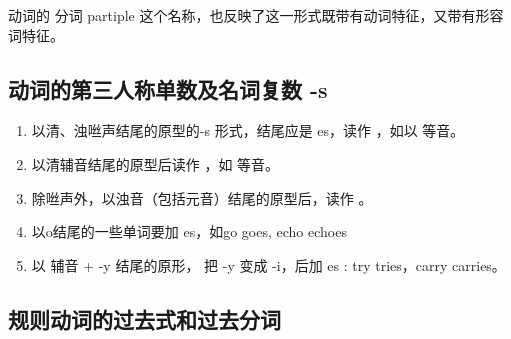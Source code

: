动词的 分词 partiple 这个名称，也反映了这一形式既带有动词特征，又带有形容词特征。


\subsection{动词的第三人称单数及名词复数 -s }

\begin{enumerate}
\item 以清、浊咝声结尾的原型的-s 形式，结尾应是 es，读作  ，如以
   等音。
\item 以清辅音结尾的原型后读作 ，如  等音。
\item 除咝声外，以浊音（包括元音）结尾的原型后，读作 。
\item 以o结尾的一些单词要加 es，如go  \Rightarrow goes, echo  \Rightarrow echoes
\item 以 辅音 + -y 结尾的原形， 把 -y 变成 -i，后加 es : try \Rightarrow tries，carry  \Rightarrow carries。
\end{enumerate}

\subsection{规则动词的过去式和过去分词}

